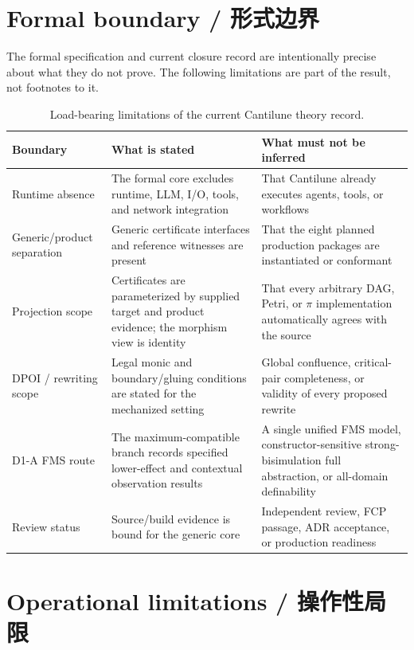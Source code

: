 \label{ch:limitations}

\section{Formal boundary / 形式边界}

The formal specification and current closure record are intentionally precise about what they do
not prove. The following limitations are part of the result, not footnotes to it.

\begin{table}[H]
\centering
\caption{Load-bearing limitations of the current Cantilune theory record.}
\label{tab:limitations}
\begin{tabularx}{\textwidth}{@{}L{0.25\textwidth}Y L{0.25\textwidth}@{}}
\toprule
{}
\textbf{Boundary} & \textbf{What is stated} & \textbf{What must not be inferred} \\
\midrule
Runtime absence & The formal core excludes runtime, LLM, I/O, tools, and network integration & That Cantilune already executes agents, tools, or workflows \\
Generic/product separation & Generic certificate interfaces and reference witnesses are present & That the eight planned production packages are instantiated or conformant \\
Projection scope & Certificates are parameterized by supplied target and product evidence; the morphism view is identity & That every arbitrary DAG, Petri, or \(\pi\) implementation automatically agrees with the source \\
DPOI / rewriting scope & Legal monic and boundary/gluing conditions are stated for the mechanized setting & Global confluence, critical-pair completeness, or validity of every proposed rewrite \\
D1-A FMS route & The maximum-compatible branch records specified lower-effect and contextual observation results & A single unified FMS model, constructor-sensitive strong-bisimulation full abstraction, or all-domain definability \\
Review status & Source/build evidence is bound for the generic core & Independent review, FCP passage, ADR acceptance, or production readiness \\
\bottomrule
\end{tabularx}
\end{table}

\section{Operational limitations / 操作性局限}

